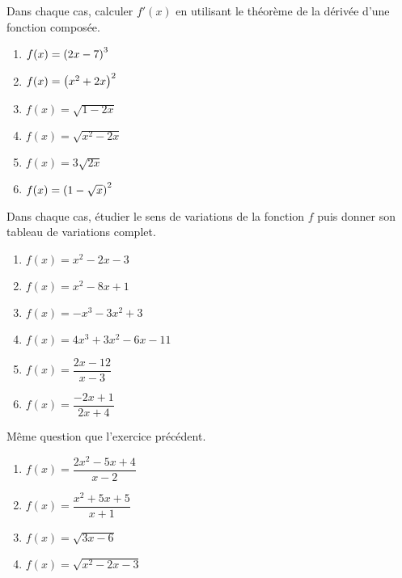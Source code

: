 \begin{exercice}
Dans chaque cas, calculer $ f'(x) $ en utilisant  le théorème  de la dérivée d'une fonction composée.
\begin{enumerate}
\item $ f(x)= \left(2x-7\right)^{3}$
\item $ f(x)=\left(x^{2}+2x\right)^{2} $  
  
\item $ f(x)=\sqrt{1-2x} $ 
\item $ f(x)=\sqrt{x^{2}-2x} $
\item $ f(x)=3\sqrt{2x} $
\item  $ f(x)=\left(1- \sqrt{x}\right)^{2} $                                                 
\end{enumerate}

  \end{exercice}
  
 
  
  \begin{exercice}
Dans chaque cas, étudier le sens de variations de la fonction $ f $ puis donner son tableau de variations complet.
\begin{enumerate}
\item $ f(x)= x^{2}-2x-3$  
\item $ f(x)= x^{2}-8x+1$ 
\item $ f(x)=-x^{3}-3x^{2} +3$ 
\item $ f(x)=4x^{3} +3x^{2}-6x-11$ 
\item $ f(x)= \dfrac{2x-12}{x-3} $
\item $ f(x)= \dfrac{-2x+1}{2x+4} $


\end{enumerate}

  \end{exercice}
  \begin{exercice}
Même question que l'exercice précédent.
\begin{enumerate}
\item $ f(x)=\dfrac{2x^{2}-5x+4}{x-2} $  
\item $ f(x)= \dfrac{x^{2}+5x+5}{x+1}$                                                   
\item $ f(x)=\sqrt{3x-6} $ 
\item $ f(x)=\sqrt{x^{2}-2x-3} $


\end{enumerate}

  \end{exercice}
  


